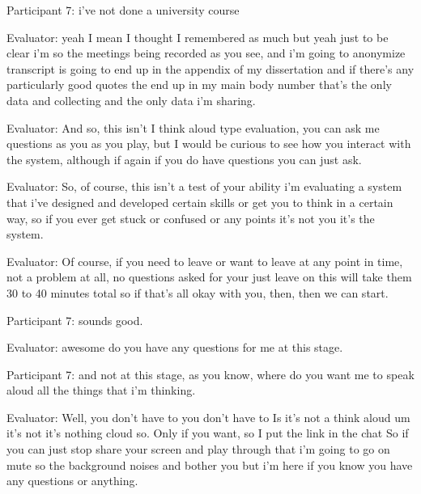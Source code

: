 \documentclass{l4proj}
\begin{document}
\begin{appendices}
Participant 7: i've not done a university course

Evaluator: yeah I mean I thought I remembered as much but yeah just to be clear i'm so the meetings being recorded as you see, and i'm going to anonymize transcript is going to end up in the appendix of my dissertation and if there's any particularly good quotes the end up in my main body number that's the only data and collecting and the only data i'm sharing.

Evaluator: And so, this isn't I think aloud type evaluation, you can ask me questions as you as you play, but I would be curious to see how you interact with the system, although if again if you do have questions you can just ask.

Evaluator: So, of course, this isn't a test of your ability i'm evaluating a system that i've designed and developed certain skills or get you to think in a certain way, so if you ever get stuck or confused or any points it's not you it's the system.

Evaluator: Of course, if you need to leave or want to leave at any point in time, not a problem at all, no questions asked for your just leave on this will take them 30 to 40 minutes total so if that's all okay with you, then, then we can start.

Participant 7: sounds good.

Evaluator: awesome do you have any questions for me at this stage.

Participant 7: and not at this stage, as you know, where do you want me to speak aloud all the things that i'm thinking.

Evaluator: Well, you don't have to you don't have to Is it's not a think aloud um it's not it's nothing cloud so. Only if you want, so I put the link in the chat So if you can just stop share your screen and play through that i'm going to go on mute so the background noises and bother you but i'm here if you know you have any questions or anything.


\end{appendices}
\end{document}

